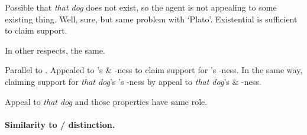 \begin{note}
  Possible that \emph{that dog} does not exist, so the agent is not appealing to some existing thing.
  Well, sure, but same problem with `Plato'.
  Existential is sufficient to claim support.

  In other respects, the same.

  Parallel to .
  Appealed to 's \RIPa{} \& \RIPb{}-ness to claim support for 's \RIPb{}-ness.
  In the same way, claiming support for \emph{that dog}'s 's \RIPb{}-ness by appeal to \emph{that dog}'s \RIPa{} \& \RIPb{}-ness.

  Appeal to \emph{that dog} and those properties have same role.
\end{note}

\paragraph*{Similarity to \dd{}/\dr{} distinction.}

